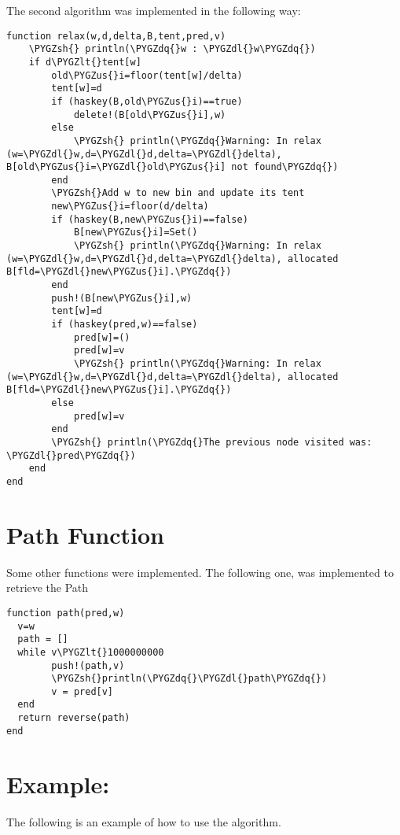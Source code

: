 \documentclass[letterpaper,10pt,english]{sphinxmanual}
\def\PYGZus{\char`\_}
\def\PYGZlt{\char`\<}
\def\PYGZsh{\char`\#}
\def\PYGZdl{\char`\$}
\def\PYGZdq{\char`\"}
\begin{document}
The second algorithm was implemented in the following way:

\begin{Verbatim}[commandchars=\\\{\}]
function relax(w,d,delta,B,tent,pred,v)
    \PYGZsh{} println(\PYGZdq{}w : \PYGZdl{}w\PYGZdq{})
    if d\PYGZlt{}tent[w]
        old\PYGZus{}i=floor(tent[w]/delta)
        tent[w]=d
        if (haskey(B,old\PYGZus{}i)==true)
            delete!(B[old\PYGZus{}i],w)
        else
            \PYGZsh{} println(\PYGZdq{}Warning: In relax (w=\PYGZdl{}w,d=\PYGZdl{}d,delta=\PYGZdl{}delta), B[old\PYGZus{}i=\PYGZdl{}old\PYGZus{}i] not found\PYGZdq{})
        end
        \PYGZsh{}Add w to new bin and update its tent
        new\PYGZus{}i=floor(d/delta)
        if (haskey(B,new\PYGZus{}i)==false)
            B[new\PYGZus{}i]=Set()
            \PYGZsh{} println(\PYGZdq{}Warning: In relax (w=\PYGZdl{}w,d=\PYGZdl{}d,delta=\PYGZdl{}delta), allocated B[fld=\PYGZdl{}new\PYGZus{}i].\PYGZdq{})
        end
        push!(B[new\PYGZus{}i],w)
        tent[w]=d
        if (haskey(pred,w)==false)
            pred[w]=()
            pred[w]=v
            \PYGZsh{} println(\PYGZdq{}Warning: In relax (w=\PYGZdl{}w,d=\PYGZdl{}d,delta=\PYGZdl{}delta), allocated B[fld=\PYGZdl{}new\PYGZus{}i].\PYGZdq{})
        else
            pred[w]=v
        end
        \PYGZsh{} println(\PYGZdq{}The previous node visited was: \PYGZdl{}pred\PYGZdq{})
    end
end
\end{Verbatim}


\section{Path Function}
\label{Algorithm:path-function}
Some other functions were implemented. The following one, was implemented to retrieve the Path

\begin{Verbatim}[commandchars=\\\{\}]
function path(pred,w)
  v=w
  path = []
  while v\PYGZlt{}1000000000
        push!(path,v)
        \PYGZsh{}println(\PYGZdq{}\PYGZdl{}path\PYGZdq{})
        v = pred[v]
  end
  return reverse(path)
end
\end{Verbatim}


\section{Example:}
\label{Algorithm:example}
The following is an example of how to use the algorithm.
\end{document}
